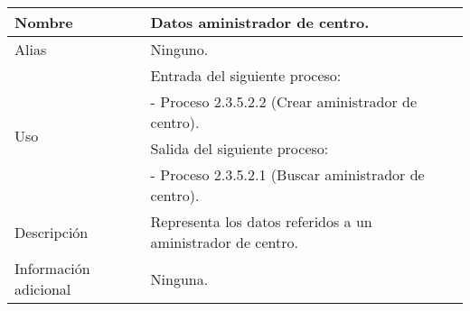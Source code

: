 \begin{center}
  \begin{tabular}{| l | p{9cm} |}
    \hline
    Nombre & \textbf{Datos aministrador de centro}.\\
    \hline
    Alias & Ninguno.\\
    \hline
    \multirow{4}{*}{Uso} & Entrada del siguiente proceso:\\
                         & - Proceso 2.3.5.2.2 (Crear aministrador de centro).\\
                         & Salida del siguiente proceso:\\
                         & - Proceso 2.3.5.2.1 (Buscar aministrador de centro).\\
    \hline
    Descripción & Representa los datos referidos a un aministrador de centro.\\
    \hline
    Información adicional & Ninguna.\\
    \hline
  \end{tabular}
\end{center}

